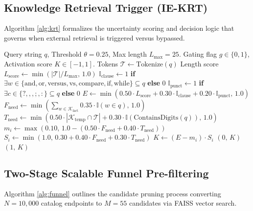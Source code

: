 \subsection{Knowledge Retrieval Trigger (IE-KRT)}
Algorithm \ref{alg:krt} formalizes the uncertainty scoring and decision logic that governs when external retrieval is triggered versus bypassed.

\begin{algorithm}[h]
\caption{INKER Knowledge Retrieval Trigger (IE-KRT)}
\label{alg:krt}
\begin{algorithmic}[1]
\REQUIRE Query string $q$, Threshold $\theta = 0.25$, Max length $L_{\text{max}} = 25$.
\ENSURE Gating flag $g \in \{0, 1\}$, Activation score $K \in [-1, 1]$.
\STATE Tokens $\mathcal{T} \leftarrow \text{Tokenize}(q)$
\STATE Length score $L_{\text{score}} \leftarrow \min(|\mathcal{T}| / L_{\text{max}}, \, 1.0)$
\STATE $\mathbb{I}_{\text{clause}} \leftarrow 1$ \textbf{if} $\exists w \in \{\text{and}, \text{or}, \text{versus}, \text{vs}, \text{compare}, \text{if}, \text{while}\} \subseteq q$ \textbf{else} $0$
\STATE $\mathbb{I}_{\text{punct}} \leftarrow 1$ \textbf{if} $\exists c \in \{?, ,, ;, :\} \subseteq q$ \textbf{else} $0$
\STATE $E \leftarrow \min(0.50 \cdot L_{\text{score}} + 0.30 \cdot \mathbb{I}_{\text{clause}} + 0.20 \cdot \mathbb{I}_{\text{punct}}, \, 1.0)$
\STATE $F_{\text{need}} \leftarrow \min(\sum_{w \in \mathcal{K}_{\text{fact}}} 0.35 \cdot \mathbb{I}(w \in q), \, 1.0)$
\STATE $T_{\text{need}} \leftarrow \min(0.50 \cdot |\mathcal{K}_{\text{temp}} \cap \mathcal{T}| + 0.30 \cdot \mathbb{I}(\text{ContainsDigits}(q)), \, 1.0)$
\STATE $m_i \leftarrow \max(0.10, \, 1.0 - (0.50 \cdot F_{\text{need}} + 0.40 \cdot T_{\text{need}}))$
\STATE $S_i \leftarrow \min(1.0, \, 0.30 + 0.40 \cdot F_{\text{need}} + 0.30 \cdot T_{\text{need}})$
\STATE $K \leftarrow (E - m_i) \cdot S_i$
    \RETURN $(0, \, K)$ 
\ELSE
    \RETURN $(1, \, K)$ 
\ENDIF
\end{algorithmic}
\end{algorithm}

\subsection{Two-Stage Scalable Funnel Pre-filtering}
Algorithm \ref{alg:funnel} outlines the candidate pruning process converting $N = 10,000$ catalog endpoints to $M = 55$ candidates via FAISS vector search.

